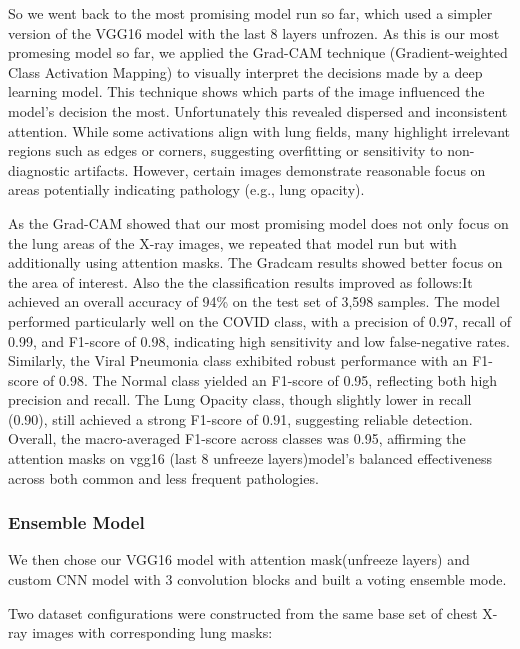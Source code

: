 \documentclass{article}
\begin{document}
So we went back to the most promising model run so far, which used a simpler version of the VGG16 model with the last 8 layers unfrozen. As this is our most promesing model so far, we applied the Grad-CAM technique (Gradient-weighted Class Activation Mapping) to visually interpret the decisions made by a deep learning model. This technique shows which parts of the image influenced the model’s decision the most. Unfortunately this revealed dispersed and inconsistent attention. While some activations align with lung fields, many highlight irrelevant regions such as edges or corners, suggesting overfitting or sensitivity to non-diagnostic artifacts. However, certain images demonstrate reasonable focus on areas potentially indicating pathology (e.g., lung opacity).

As the Grad-CAM showed that our most promising model does not only focus on the lung areas of the X-ray images, we repeated that model run but with additionally using attention masks. The Gradcam results showed better focus on the area of interest. Also the the classification results improved as follows:It achieved an overall accuracy of 94\% on the test set of 3,598 samples. The model performed particularly well on the COVID class, with a precision of 0.97, recall of 0.99, and F1-score of 0.98, indicating high sensitivity and low false-negative rates. Similarly, the Viral Pneumonia class exhibited robust performance with an F1-score of 0.98. The Normal class yielded an F1-score of 0.95, reflecting both high precision and recall. The Lung Opacity class, though slightly lower in recall (0.90), still achieved a strong F1-score of 0.91, suggesting reliable detection. Overall, the macro-averaged F1-score across classes was 0.95, affirming the attention masks on vgg16 (last 8 unfreeze layers)model’s balanced effectiveness across both common and less frequent pathologies.



\subsubsection {Ensemble Model} 
We then chose our VGG16 model with attention mask(unfreeze layers) and custom CNN model with 3 convolution blocks and built a voting ensemble mode.

Two dataset configurations were constructed from the same base set of chest X-ray images with corresponding lung masks:
\end{document}
